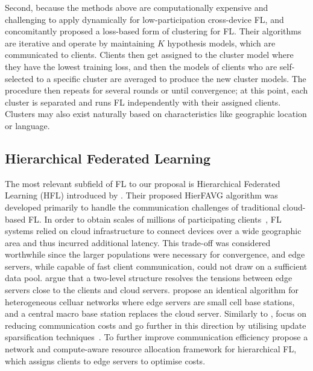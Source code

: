Second, because the methods above are computationally expensive and challenging to apply dynamically for low-participation cross-device FL, \citet{AnEfficientFrameworkForClusteredFL} and \citet{ThreeApproachesMansour} concomitantly proposed a loss-based form of clustering for FL. Their algorithms are iterative and operate by maintaining $K$ hypothesis models, which are communicated to clients. Clients then get assigned to the cluster model where they have the lowest training loss, and then the models of clients who are self-selected to a specific cluster are averaged to produce the new cluster models. The procedure then repeats for several rounds or until convergence; at this point, each cluster is separated and runs FL independently with their assigned clients. Clusters may also exist naturally based on characteristics like geographic location or language.





\subsection{Hierarchical Federated Learning}\label{sec:back:HFL}


The most relevant subfield of FL to our proposal is Hierarchical Federated Learning (HFL) introduced by \citet{Client-Edge-CloudHierFL}. Their proposed HierFAVG algorithm was developed primarily to handle the communication challenges of traditional cloud-based FL\@. In order to obtain scales of millions of participating clients~\citep{GoogleKeyboard, ScaleSystemDesign}, FL systems relied on cloud infrastructure to connect devices over a wide geographic area and thus incurred additional latency. This trade-off was considered worthwhile since the larger populations were necessary for convergence, and edge servers, while capable of fast client communication, could not draw on a sufficient data pool. \citet{Client-Edge-CloudHierFL} argue that a two-level structure resolves the tensions between edge servers close to the clients and cloud servers. \citet{Hier_Het_Cellular} propose an identical algorithm for heterogeneous celluar networks where edge servers are small cell base stations, and a central macro base station replaces the cloud server. Similarly to \citet{Client-Edge-CloudHierFL}, \citet{Hier_Het_Cellular} focus on reducing communication costs and go further in this direction by utilising update sparsification techniques~\citep{DeepGradientCompressin,CommCompressionDecent}. To further improve communication efficiency \citet{HFELJointEdgeResource} propose a network and compute-aware resource allocation framework for hierarchical FL, which assigns clients to edge servers to optimise costs.


